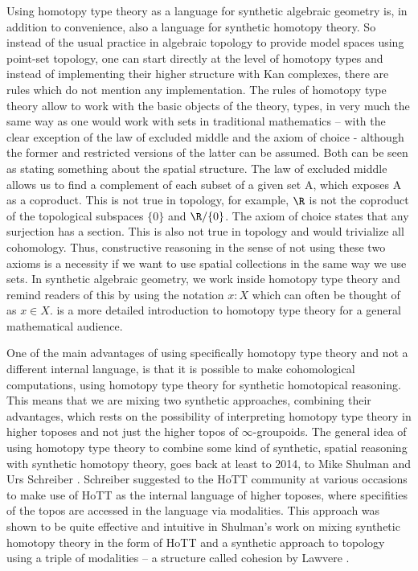 Using homotopy type theory as a language for synthetic algebraic geometry is, in addition to convenience, also a language for synthetic homotopy theory.
So instead of the usual practice in algebraic topology to provide model spaces using point-set topology, one can start directly at the level of homotopy types and instead of implementing their higher structure with Kan complexes, there are rules which do not mention any implementation.
The rules of homotopy type theory allow to work with the basic objects of the theory, types, in very much the same way as one would work with sets in traditional mathematics -- with the clear exception of the law of excluded middle and the axiom of choice - although the former and restricted versions of the latter can be assumed.
Both can be seen as stating something about the spatial structure. The law of excluded middle allows us to find a complement of each subset of a given set A, which exposes A as a coproduct.
This is not true in topology, for example, $\R$ is not the coproduct of the topological subspaces $\{0\}$ and $\R/\{0\}$.
The axiom of choice states that any surjection has a section. This is also not true in topology and would trivialize all cohomology.
Thus, constructive reasoning in the sense of not using these two axioms is a necessity if we want to use spatial collections in the same way we use sets.
In synthetic algebraic geometry, we work inside homotopy type theory and remind readers of this by using the notation $x:X$ which can often be thought of as $x\in X$.
\cite{shulman-logic-of-spaces} is a more detailed introduction to homotopy type theory for a general mathematical audience.


One of the main advantages of using specifically homotopy type theory and not a different internal language,
is that it is possible to make cohomological computations, using homotopy type theory for synthetic homotopical reasoning.
This means that we are mixing two synthetic approaches, combining their advantages,
which rests on the possibility of interpreting homotopy type theory in higher toposes \cite{shulman2019all} and not just the higher topos of $\infty$-groupoids.
The general idea of using homotopy type theory to combine some kind of synthetic, spatial reasoning with synthetic homotopy theory, goes back at least to 2014, to Mike Shulman and Urs Schreiber \cite{Schreiber_2014}.
Schreiber suggested to the HoTT community at various occasions to make use of HoTT as the internal language of higher toposes, where specifities of the topos are accessed in the language via modalities.
This approach was shown to be quite effective and intuitive in Shulman's \cite{shulman-Brouwer-fixed-point} work on mixing synthetic homotopy theory in the form of HoTT and a synthetic approach to topology using a triple of modalities -- a structure called cohesion by Lawvere \cite{Lawvere2007}.

